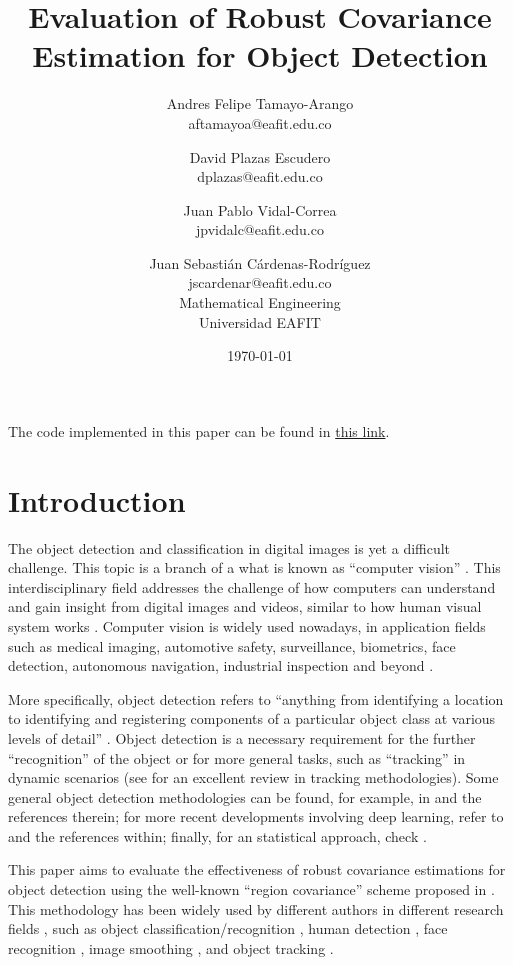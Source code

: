 \documentclass[11pt]{article}
\title{Evaluation of Robust Covariance Estimation for Object Detection}
\author{Andres Felipe Tamayo-Arango \\
  aftamayoa@eafit.edu.co \and
  David Plazas Escudero \\
  dplazas@eafit.edu.co \and
  Juan Pablo Vidal-Correa \\
  jpvidalc@eafit.edu.co \and
  Juan Sebasti\'an C\'ardenas-Rodríguez \\
  jscardenar@eafit.edu.co \\[0.5cm]
  Mathematical Engineering \\
  Universidad EAFIT}
\date{\today}
\theoremstyle{definition}
\theoremstyle{remark}
\theoremstyle{remark}
\theoremstyle{remark}
\begin{document}
\maketitle

The code implemented in this paper can be found in
\href{https://bit.ly/3rQbVRQ}{this link}.

\section{Introduction}\label{sec_int}
The object detection and classification in digital images is yet a difficult
challenge. This topic is a branch of a what is known as ``computer vision''
\parencite{amit20022d}. This interdisciplinary field addresses the challenge of
how computers can understand and gain insight from digital images and videos,
similar to how human visual system works
\cite{ballard1982computer,huang1996computer,amit20022d,szeliski2010computer}.
Computer vision is widely used nowadays, in application fields such as medical
imaging, automotive safety, surveillance, biometrics, face detection, autonomous
navigation, industrial inspection and beyond
\cite{huang1996computer,szeliski2010computer}.

More specifically, object detection refers to ``anything from identifying a
location to identifying and registering components of a particular object class
at various levels of detail'' \parencite{amit20022d}. Object detection is a
necessary requirement for the further ``recognition'' of the object or for more
general tasks, such as ``tracking'' in dynamic scenarios (see
\cite{li2013survey} for an excellent review in tracking methodologies). Some
general object detection methodologies can be found, for example, in
\cite{amit20022d,szeliski2010computer} and the references therein; for more
recent developments involving deep learning, refer to
\cite{jiang2018deep,zhao2019object} and the references within; finally, for an
statistical approach, check \cite{li2015feature}.

This paper aims to evaluate the effectiveness of robust covariance estimations
for object detection using the well-known ``region covariance'' scheme proposed
in \parencite{tuzel2006}. This methodology has been widely used by different
authors in different research fields \cite{wu2012real}, such as object
classification/recognition
\cite{hong2009sigma,sivalingam2010tensor,tosato2010multi}, human detection
\cite{paisitkriangkrai2008fast,tuzel2007human,yao2007fast,hirzer2011person},
face recognition \cite{pang2008gabor,hariri20163d}, image smoothing
\cite{karacan2013structure}, and object tracking
\cite{porikli2006covariance,wu2008probabilistic,wu2009real,wu2009robust}.
\end{document}
